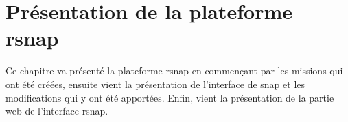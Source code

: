 \chapter{Présentation de la plateforme rsnap}
Ce chapitre va présenté la plateforme \gls{rsnap} en commençant par les missions qui ont été créées, ensuite vient la présentation de l'interface de \gls{snap} et les modifications qui y ont été apportées. Enfin, vient la présentation de la partie web de l'interface \gls{rsnap}.



